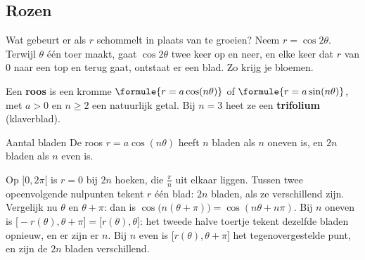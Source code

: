 
\begin{oefeningen}
\end{oefeningen}

\subsection{Rozen}

Wat gebeurt er als $r$ schommelt in plaats van te groeien? Neem $r = \cos2\theta$. Terwijl $\theta$ één toer maakt, gaat $\cos2\theta$ twee keer op en neer, en elke keer dat $r$ van 0 naar een top en terug gaat, ontstaat er een blad. Zo krijg je bloemen.

\begin{theorie}
Een \textbf{\textcolor{accent}{roos}} is een kromme $\formule{r = a\cos(n\theta)}$ of $\formule{r = a\sin(n\theta)}$, met $a > 0$ en $n \geqslant 2$ een natuurlijk getal. Bij $n = 3$ heet ze een \textbf{\textcolor{accent}{trifolium}} (klaverblad).

\begin{stelling}{Aantal bladen}
De roos $r = a\cos(n\theta)$ heeft $n$ bladen als $n$ oneven is, en $2n$ bladen als $n$ even is.
\end{stelling}

\begin{bewijs}
Op $[0, 2\pi[$ is $r = 0$ bij $2n$ hoeken, die $\tfrac{\pi}{n}$ uit elkaar liggen. Tussen twee opeenvolgende nulpunten tekent $r$ één blad: $2n$ bladen, als ze verschillend zijn. Vergelijk nu $\theta$ en $\theta + \pi$: dan is $\cos\bigl(n(\theta + \pi)\bigr) = \cos(n\theta + n\pi)$.
Bij $n$ oneven is $\bigl[-r(\theta), \theta + \pi\bigr] = \bigl[r(\theta), \theta\bigr]$: het tweede halve toertje tekent dezelfde bladen opnieuw, en er zijn er $n$. Bij $n$ even is $\bigl[r(\theta), \theta + \pi\bigr]$ het tegenovergestelde punt, en zijn de $2n$ bladen verschillend.
\end{bewijs}
\end{theorie}


